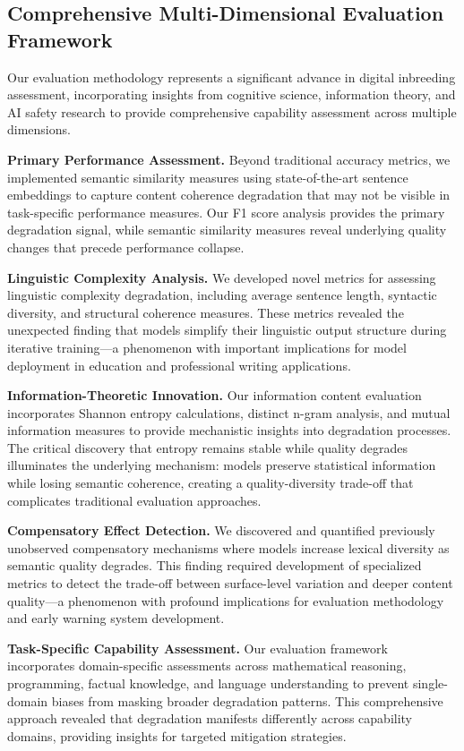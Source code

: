 \documentclass{article}
\begin{document}
\subsection{Comprehensive Multi-Dimensional Evaluation Framework}

Our evaluation methodology represents a significant advance in digital inbreeding assessment, incorporating insights from cognitive science, information theory, and AI safety research to provide comprehensive capability assessment across multiple dimensions.

\textbf{Primary Performance Assessment.} Beyond traditional accuracy metrics, we implemented semantic similarity measures using state-of-the-art sentence embeddings to capture content coherence degradation that may not be visible in task-specific performance measures. Our F1 score analysis provides the primary degradation signal, while semantic similarity measures reveal underlying quality changes that precede performance collapse.

\textbf{Linguistic Complexity Analysis.} We developed novel metrics for assessing linguistic complexity degradation, including average sentence length, syntactic diversity, and structural coherence measures. These metrics revealed the unexpected finding that models simplify their linguistic output structure during iterative training—a phenomenon with important implications for model deployment in education and professional writing applications.

\textbf{Information-Theoretic Innovation.} Our information content evaluation incorporates Shannon entropy calculations, distinct n-gram analysis, and mutual information measures to provide mechanistic insights into degradation processes. The critical discovery that entropy remains stable while quality degrades illuminates the underlying mechanism: models preserve statistical information while losing semantic coherence, creating a quality-diversity trade-off that complicates traditional evaluation approaches.

\textbf{Compensatory Effect Detection.} We discovered and quantified previously unobserved compensatory mechanisms where models increase lexical diversity as semantic quality degrades. This finding required development of specialized metrics to detect the trade-off between surface-level variation and deeper content quality—a phenomenon with profound implications for evaluation methodology and early warning system development.

\textbf{Task-Specific Capability Assessment.} Our evaluation framework incorporates domain-specific assessments across mathematical reasoning, programming, factual knowledge, and language understanding to prevent single-domain biases from masking broader degradation patterns. This comprehensive approach revealed that degradation manifests differently across capability domains, providing insights for targeted mitigation strategies.
\end{document}
